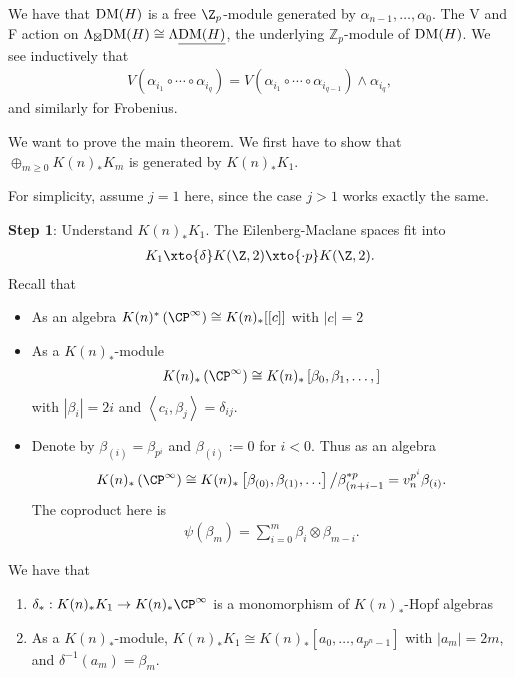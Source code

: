 We have that $\text{DM}(H)$ is a free $\Z_p$-module generated by $\alpha_{n-1}, \ldots, \alpha_0$. The V and F action on $\Lambda_\boxtimes \text{DM}(H) \cong \Lambda \underline{\text{DM}(H)}$, the underlying $\mathbb{Z}_p$-module of $\text{DM}(H)$. We see inductively that
\begin{align*}
    V \left( \alpha_{i_1} \circ \cdots \circ \alpha_{i_q} \right) = V \left( \alpha_{i_1} \circ \cdots \circ \alpha_{i_{q-1}} \right)\wedge \alpha_{i_q},
\end{align*}
and similarly for Frobenius.

We want to prove the main theorem. We first have to show that $\oplus_{m\ge 0} K(n)_\ast K_m$ is generated by $K(n)_\ast K_1$.

For simplicity, assume $j=1$ here, since the case $j>1$ works exactly the same.

\textbf{Step 1}: Understand $K(n)_\ast K_1$. The Eilenberg-Maclane spaces fit into
\begin{align*}
    K_1 \xto{\delta} K(\Z,2) \xto{\cdot p} K(\Z,2).
\end{align*}
Recall that
\begin{itemize}
    \item As an algebra $K(n)^\ast \left( \CP^\infty \right) \cong K(n)_\ast [[c]]$ with $|c|=2$
    \item As a $K(n)_\ast$-module
    \begin{align*}
        K(n)_\ast \left( \CP^\infty \right) \cong K(n)_\ast \left[ \beta_0,\beta_1, \ldots,  \right]
    \end{align*}
    with $|\beta_i| = 2i$ and $\left\langle c_i, \beta_j \right\rangle = \delta_{ij}$.

    \item Denote by $\beta_{(i)} = \beta_{p^i}$ and $\beta_{(i)} := 0$ for $i<0$. Thus as an algebra
    \begin{align*}
        K(n)_\ast \left( \CP^\infty \right) \cong K(n)_\ast \left[ \beta_{(0)}, \beta_{(1)}, \ldots \right] \big/ \beta_{(n+i-1}^{\ast p} = v_n^{p^i} \beta_{(i)}.
    \end{align*}
    The coproduct here is
    \begin{align*}
        \psi(\beta_m) = \sum_{i=0}^m \beta_i \otimes \beta_{m-i}.
    \end{align*}

\end{itemize}

\begin{theorem} We have that
\begin{enumerate}
    \item $\delta_\ast : K(n)_\ast K_1 \to K(n)_\ast \CP^\infty$ is a monomorphism of $K(n)_\ast$-Hopf algebras
    \item As a $K(n)_\ast$-module, $K(n)_\ast K_1 \cong K(n)_\ast [a_0, \ldots, a_{p^n-1}]$ with $|a_m| = 2m$, and $\delta^{-1}(a_m) = \beta_m$.
\end{enumerate}
\end{theorem}

